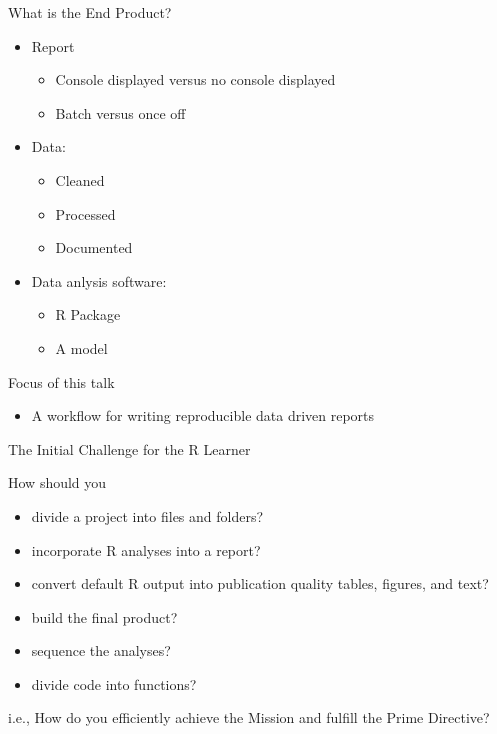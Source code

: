 \begin{frame}{What is the End Product?}
\begin{itemize}
\item Report
	\begin{itemize}
	  \item Console displayed versus no console displayed 
	  \item Batch versus once off
	\end{itemize}     
\item Data: 
	\begin{itemize}
  	  \item Cleaned
	  \item Processed
	  \item Documented
    \end{itemize}
\item Data anlysis software: 
	\begin{itemize}
	  \item R Package
	  \item A model 
	\end{itemize}
\end{itemize}

\begin{block}{Focus of this talk}
\begin{itemize}
  \item A workflow for writing reproducible data driven reports
\end{itemize}
\end{block}
\end{frame}


\begin{frame}{The Initial Challenge for the R Learner}
\begin{block}{How should you}
\begin{itemize}
\item  divide a project into files and folders?
\item incorporate R analyses into a report?
\item convert default R output into publication quality 
  tables, figures, and text?
\item build the final product?
\item sequence the analyses?
\item divide code into functions?
\end{itemize}
\end{block}
i.e., How do you efficiently achieve the Mission and fulfill the Prime Directive?
\end{frame}


